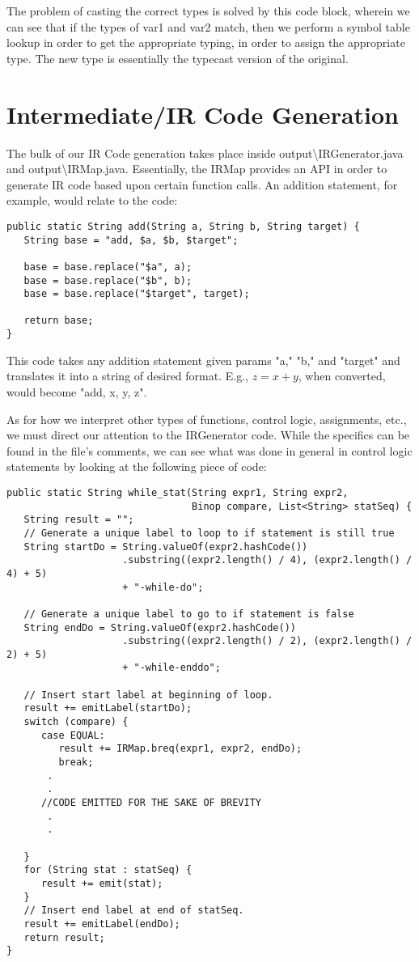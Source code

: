 \documentclass[a4paper]{article}
\begin{document}
The problem of casting the correct types is solved by this code block, wherein we can see that if the types of var1 and var2 match, then we perform a symbol table lookup in order to get the appropriate typing, in order to assign the appropriate type. The new type is essentially the typecast version of the original. 

\section{Intermediate/IR Code Generation}
The bulk of our IR Code generation takes place inside output\textbackslash IRGenerator.java and output\textbackslash IRMap.java. Essentially, the IRMap provides an API in order to generate IR code based upon certain function calls. An addition statement, for example, would relate to the code: 
\begin{verbatim}
public static String add(String a, String b, String target) {
   String base = "add, $a, $b, $target";
    
   base = base.replace("$a", a);
   base = base.replace("$b", b);
   base = base.replace("$target", target);

   return base;
}
\end{verbatim}

This code takes any addition statement given params "a," "b," and "target" and translates it into a string of desired format. E.g., $z=x+y$, when converted, would become "add, x, y, z".

As for how we interpret other types of functions, control logic, assignments, etc., we must direct our attention to the IRGenerator code. While the specifics can be found in the file's comments, we can see what was done in general in control logic statements by looking at the following piece of code:

\begin{verbatim}
public static String while_stat(String expr1, String expr2, 
                                Binop compare, List<String> statSeq) {
   String result = "";
   // Generate a unique label to loop to if statement is still true
   String startDo = String.valueOf(expr2.hashCode())
                    .substring((expr2.length() / 4), (expr2.length() / 4) + 5)
                    + "-while-do";
    
   // Generate a unique label to go to if statement is false
   String endDo = String.valueOf(expr2.hashCode())
                    .substring((expr2.length() / 2), (expr2.length() / 2) + 5)
                    + "-while-enddo";
    
   // Insert start label at beginning of loop.
   result += emitLabel(startDo);
   switch (compare) {
      case EQUAL:
         result += IRMap.breq(expr1, expr2, endDo);
         break;
       .
       .
      //CODE EMITTED FOR THE SAKE OF BREVITY
       .
       .

   }
   for (String stat : statSeq) {
      result += emit(stat);
   }
   // Insert end label at end of statSeq.
   result += emitLabel(endDo);
   return result;
}
\end{verbatim}
\end{document}
